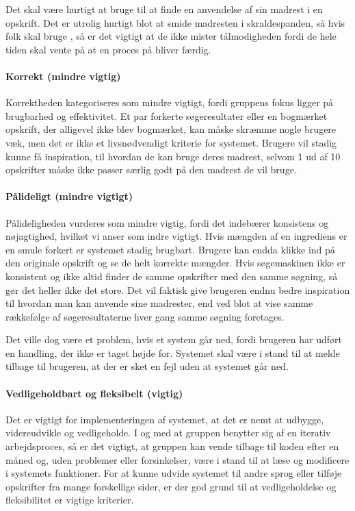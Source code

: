Det skal være hurtigt at bruge \Foodl{} til at finde en anvendelse af sin madrest i en opskrift. Det er utrolig hurtigt blot at smide madresten i skraldespanden, så hvis folk skal bruge \Foodl{}, så er det vigtigt at de ikke mister tålmodigheden fordi de hele tiden skal vente på at en proces på \Foodl{} bliver færdig. 

\paragraph{Korrekt (mindre vigtig)} 
Korrektheden kategoriseres som mindre vigtigt, fordi gruppens fokus ligger på brugbarhed og effektivitet. Et par forkerte søgeresultater eller en bogmærket opskrift, der alligevel ikke blev bogmærket, kan måske skræmme nogle brugere væk, men det er ikke et livsnødvendigt kriterie for systemet. Brugere vil stadig kunne få inspiration, til hvordan de kan bruge deres madrest, selvom 1 ud af 10 opskrifter måske ikke passer særlig godt på den madrest de vil bruge.

\paragraph{Pålideligt (mindre vigtigt)} 
Pålideligheden vurderes som mindre vigtig, fordi det indebærer konsistens og nøjagtighed, hvilket vi anser som indre vigtigt. Hvis mængden af en ingrediens er en smule forkert er systemet stadig brugbart. Brugere kan endda klikke ind på den originale opskrift og se de helt korrekte mængder. Hvis søgemaskinen ikke er konsistent og ikke altid finder de samme opskrifter med den samme søgning, så gør det heller ikke det store. Det vil faktisk give brugeren endnu bedre inspiration til hvordan man kan anvende sine madrester, end ved blot at vise samme rækkefølge af søgeresultaterne hver gang samme søgning foretages.

Det ville dog være et problem, hvis et system går ned, fordi brugeren har udført en handling, der ikke er taget højde for. Systemet skal være i stand til at melde tilbage til brugeren, at der er sket en fejl uden at systemet går ned.

\paragraph{Vedligeholdbart og fleksibelt (vigtig)} 
Det er vigtigt for implementeringen af systemet, at det er nemt at udbygge, videreudvikle og vedligeholde. I og med at gruppen benytter sig af en iterativ arbejdsproces, så er det vigtigt, at gruppen kan vende tilbage til koden efter \fx en måned og, uden problemer eller forsinkelser, være i stand til at læse og modificere i systemets funktioner. For at kunne udvide systemet til andre sprog eller tilføje opskrifter fra mange forskellige sider, er der god grund til at vedligeholdelse og fleksibilitet er vigtige kriterier.

